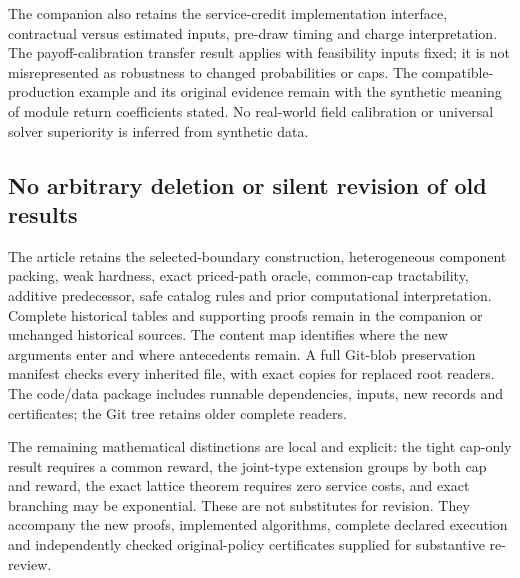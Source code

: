 The companion also retains the service-credit implementation interface, contractual versus estimated inputs, pre-draw timing and charge interpretation. The payoff-calibration transfer result applies with feasibility inputs fixed; it is not misrepresented as robustness to changed probabilities or caps. The compatible-production example and its original evidence remain with the synthetic meaning of module return coefficients stated. No real-world field calibration or universal solver superiority is inferred from synthetic data.

\subsection{No arbitrary deletion or silent revision of old results}
The article retains the selected-boundary construction, heterogeneous component packing, weak hardness, exact priced-path oracle, common-cap tractability, additive predecessor, safe catalog rules and prior computational interpretation. Complete historical tables and supporting proofs remain in the companion or unchanged historical sources. The content map identifies where the new arguments enter and where antecedents remain. A full Git-blob preservation manifest checks every inherited file, with exact copies for replaced root readers. The code/data package includes runnable dependencies, inputs, new records and certificates; the Git tree retains older complete readers.

The remaining mathematical distinctions are local and explicit: the tight cap-only result requires a common reward, the joint-type extension groups by both cap and reward, the exact lattice theorem requires zero service costs, and exact branching may be exponential. These are not substitutes for revision. They accompany the new proofs, implemented algorithms, complete declared execution and independently checked original-policy certificates supplied for substantive re-review.
